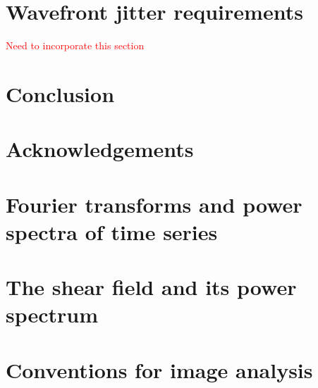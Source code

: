 \documentclass[preprint]{aastex}
\newcommand{\CMH}[1]{{\textcolor{red}{#1}}}
\begin{document}


\section{Wavefront jitter requirements}
\label{sec:jitter}

\CMH{Need to incorporate this section}

\section{Conclusion}


\section*{Acknowledgements}

\appendix

\section{Fourier transforms and power spectra of time series}
\label{sec:FTTime}



\section{The shear field and its power spectrum}
\label{sec:Fourier-tensor}



\section{Conventions for image analysis}
\label{sec:ellipticity}




\end{document}
